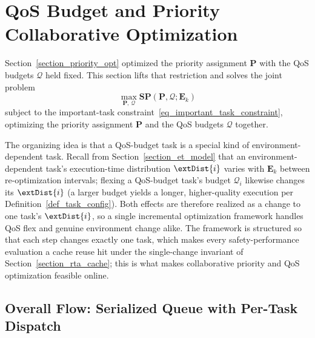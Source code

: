 	\section{QoS Budget and Priority Collaborative Optimization}
	\label{section_config_opt}

    Section~\ref{section_priority_opt} optimized the priority assignment $\boldsymbol{P}$ with the QoS budgets $\boldsymbol{\mathcal{Q}}$ held fixed.
    This section lifts that restriction and solves the joint problem
    \begin{equation}
        \max_{\boldsymbol{P},\, \boldsymbol{\mathcal{Q}}} \textbf{SP}(\boldsymbol{P}, \boldsymbol{\mathcal{Q}}; \textbf{E}_k)
        \label{eq:joint_pa_qos}
    \end{equation}
    subject to the important-task constraint~\eqref{eq_important_task_constraint}, optimizing the priority assignment $\boldsymbol{P}$ and the QoS budgets $\boldsymbol{\mathcal{Q}}$ together.

    The organizing idea is that a QoS-budget task is a special kind of environment-dependent task.
    Recall from Section~\ref{section_et_model} that an environment-dependent task's execution-time distribution $\extDist{i}$ varies with $\textbf{E}_k$ between re-optimization intervals; flexing a QoS-budget task's budget $\mathcal{Q}_i$ likewise changes its $\extDist{i}$ (a larger budget yields a longer, higher-quality execution per Definition~\ref{def_task_config}).
    Both effects are therefore realized as a change to one task's $\extDist{i}$, so a single incremental optimization framework handles QoS flex and genuine environment change alike.
    The framework is structured so that each step changes exactly one task, which makes every safety-performance evaluation a cache reuse hit under the single-change invariant of Section~\ref{section_rta_cache}; this is what makes collaborative priority and QoS optimization feasible online.

    \subsection{Overall Flow: Serialized Queue with Per-Task Dispatch}
    \label{section_overall_flow}

